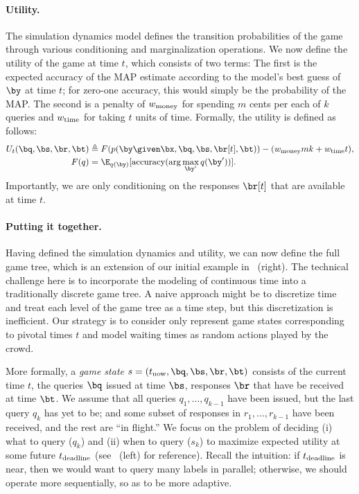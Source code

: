 \paragraph{Utility.}

The simulation dynamics model defines the transition probabilities of the game
through various conditioning and marginalization operations.
We now define the utility of the game at time $t$, which consists of two terms:
The first is the expected accuracy of the MAP estimate according to the model's best guess of $\by$ at time $t$;
for zero-one accuracy, this would simply be the probability of the MAP.
The second is a penalty of $w_\text{money}$ for spending $m$ cents per each of $k$ queries
and $w_\text{time}$ for taking $t$ units of time.
Formally, the utility is defined as follows:
\begin{align}
  \label{eqn:utility}
  U_t(\bq, \bs, \br, \bt) &\eqdef F(p(\by \given \bx, \bq, \bs, \br[t], \bt)) - (\weightmoney m k + \weighttime t), \\
  F(q) &= \E_{q(\by)}[\accuracy(\arg\max_{\by'} q(\by'))].
\end{align}
Importantly, we are only conditioning on the responses $\br[t]$ that are available at time $t$.

\paragraph{Putting it together.}

Having defined the simulation dynamics and utility, we can now define the full game tree,
which is an extension of our initial example in ~(right).
The technical challenge here is to incorporate the modeling of continuous time
into a traditionally discrete game tree.
A naive approach might be to discretize time and treat each level of the game
tree as a time step, but this discretization is inefficient.
Our strategy is to consider only represent game states corresponding to pivotal times $t$
and model waiting times as random actions played by the crowd.

More formally, a \emph{game state} $s = (\now, \bq, \bs, \br, \bt)$
consists of the current time $t$, the queries $\bq$ issued at time $\bs$,
responses $\br$ that have be received at time $\bt$.
We assume that all queries $q_1, \dots, q_{k-1}$ have been issued,
but the last query $q_k$ has yet to be;
and some subset of responses in $r_1, \dots, r_{k-1}$ have been received,
and the rest are ``in flight.''
We focus on the problem of deciding (i) what to query ($q_k$)
and (ii) when to query ($s_k$) to maximize expected utility
at some future $t_\text{deadline}$ (see ~(left) for reference).
Recall the intuition: if $t_\text{deadline}$ is near, then we would want to query
many labels in parallel; otherwise, we should operate more sequentially,
so as to be more adaptive.

